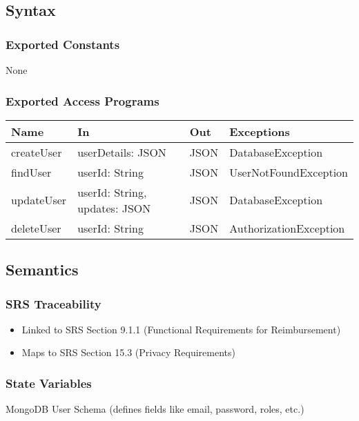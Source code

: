 \documentclass[12pt, titlepage]{article}
\begin{document}
\subsection{Syntax}

\subsubsection{Exported Constants}
None

\subsubsection{Exported Access Programs}

\begin{center}
\begin{tabular}{p{2cm} p{4cm} p{2cm} p{4cm}}
\hline
\textbf{Name} & \textbf{In} & \textbf{Out} & \textbf{Exceptions} \\
\hline
createUser & userDetails: JSON & JSON & DatabaseException \\
findUser & userId: String & JSON & UserNotFoundException \\
updateUser & userId: String, updates: JSON & JSON & DatabaseException \\
deleteUser & userId: String & JSON & AuthorizationException \\
\hline
\end{tabular}
\end{center}

\subsection{Semantics}

\subsubsection{SRS Traceability}
\begin{itemize}
  \item Linked to SRS Section 9.1.1 (Functional Requirements for Reimbursement)
  \item Maps to SRS Section 15.3 (Privacy Requirements)
\end{itemize}

\subsubsection{State Variables}
MongoDB User Schema (defines fields like email, password, roles, etc.)
\end{document}
